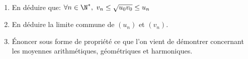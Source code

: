 \documentclass[a4paper]{article}
\begin{document}
\begin{enumerate}
\item En d\'eduire que: $\forall n \in\N^*,\ v_n\leq \sqrt{u_0v_0}\leq u_n$
\item En d\'eduire la limite commune de $(u_n)$ et $(v_n)$.
\item \'Enoncer sous forme de propri\'et\'e ce que l'on vient de d\'emontrer
  concernant les moyennes arithm\'etiques, g\'eom\'etriques et harmoniques.
\end{enumerate}
\end{document}
